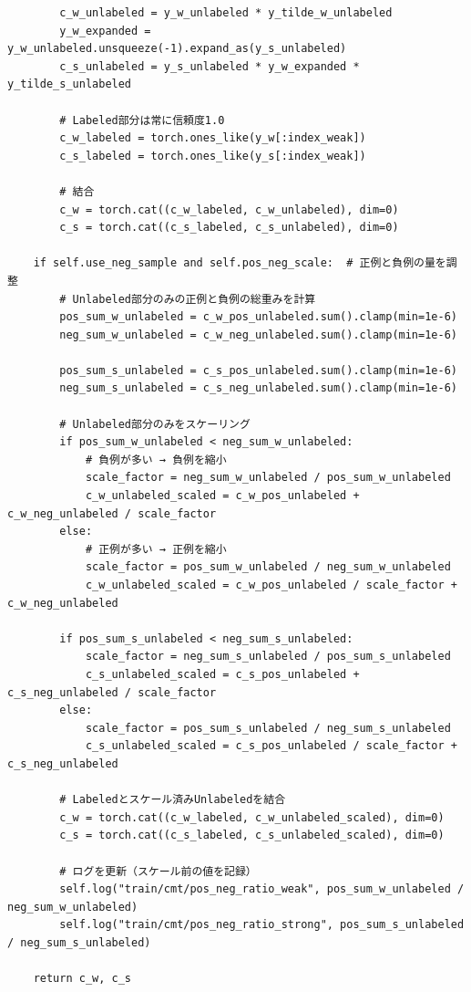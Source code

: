 \documentclass[../main.tex]{subfiles}
\begin{document}
\begin{verbatim}
        c_w_unlabeled = y_w_unlabeled * y_tilde_w_unlabeled
        y_w_expanded = y_w_unlabeled.unsqueeze(-1).expand_as(y_s_unlabeled)
        c_s_unlabeled = y_s_unlabeled * y_w_expanded * y_tilde_s_unlabeled

        # Labeled部分は常に信頼度1.0
        c_w_labeled = torch.ones_like(y_w[:index_weak])
        c_s_labeled = torch.ones_like(y_s[:index_weak])

        # 結合
        c_w = torch.cat((c_w_labeled, c_w_unlabeled), dim=0)
        c_s = torch.cat((c_s_labeled, c_s_unlabeled), dim=0)

    if self.use_neg_sample and self.pos_neg_scale:  # 正例と負例の量を調整
        # Unlabeled部分のみの正例と負例の総重みを計算
        pos_sum_w_unlabeled = c_w_pos_unlabeled.sum().clamp(min=1e-6)
        neg_sum_w_unlabeled = c_w_neg_unlabeled.sum().clamp(min=1e-6)

        pos_sum_s_unlabeled = c_s_pos_unlabeled.sum().clamp(min=1e-6)
        neg_sum_s_unlabeled = c_s_neg_unlabeled.sum().clamp(min=1e-6)

        # Unlabeled部分のみをスケーリング
        if pos_sum_w_unlabeled < neg_sum_w_unlabeled:
            # 負例が多い → 負例を縮小
            scale_factor = neg_sum_w_unlabeled / pos_sum_w_unlabeled
            c_w_unlabeled_scaled = c_w_pos_unlabeled + c_w_neg_unlabeled / scale_factor
        else:
            # 正例が多い → 正例を縮小
            scale_factor = pos_sum_w_unlabeled / neg_sum_w_unlabeled
            c_w_unlabeled_scaled = c_w_pos_unlabeled / scale_factor + c_w_neg_unlabeled

        if pos_sum_s_unlabeled < neg_sum_s_unlabeled:
            scale_factor = neg_sum_s_unlabeled / pos_sum_s_unlabeled
            c_s_unlabeled_scaled = c_s_pos_unlabeled + c_s_neg_unlabeled / scale_factor
        else:
            scale_factor = pos_sum_s_unlabeled / neg_sum_s_unlabeled
            c_s_unlabeled_scaled = c_s_pos_unlabeled / scale_factor + c_s_neg_unlabeled

        # Labeledとスケール済みUnlabeledを結合
        c_w = torch.cat((c_w_labeled, c_w_unlabeled_scaled), dim=0)
        c_s = torch.cat((c_s_labeled, c_s_unlabeled_scaled), dim=0)

        # ログを更新（スケール前の値を記録）
        self.log("train/cmt/pos_neg_ratio_weak", pos_sum_w_unlabeled / neg_sum_w_unlabeled)
        self.log("train/cmt/pos_neg_ratio_strong", pos_sum_s_unlabeled / neg_sum_s_unlabeled)

    return c_w, c_s
\end{verbatim}
\end{document}
